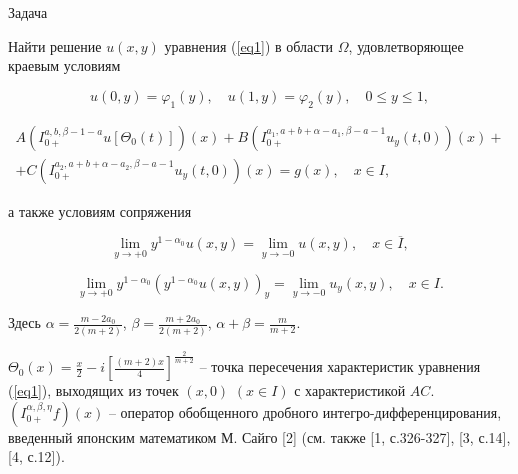 \begin{newthm}{Задача} {Найти решение $u(x,y)$ уравнения (\ref{eq1}) в области $\Omega$, удовлетворяющее краевым условиям

\begin{equation}

       \label{eq2}

u(0,y) = \varphi_{1}(y), \quad  u(1,y) = \varphi_{2}(y), \quad  0 \leqslant y \leqslant 1,

\end{equation}

\begin{equation}

      \label{eq3}{\begin{array}{l}

A \left( I^{ a,b,\beta-1-a}_{0+} u[ \Theta_{0}(t)] \right) (x)+B \left( I^{ a_{1},a+b+\alpha-a_{1}, \beta-a-1}_{0+} u_{y}(t,0) \right) (x)+ \\

 + C \left( I^{ a_{2},a+b+\alpha-a_{2},\beta-a-1}_{0+} u_{y}(t,0) \right) (x)=g(x), \quad x \in I,

\end{array}}

\end{equation}

\noindent а также условиям сопряжения

\begin{equation}

       \label{eq4}

\lim_{y \to +0} y^{1-\alpha_{0}} u(x,y) = \lim_{y \to -0} u(x,y), \quad   x \in \overline{I},

\end{equation}

\begin{equation}

       \label{eq5}

\lim_{y \to +0} y^{1-\alpha_{0}} \left( y^{1-\alpha_{0}}  u(x,y) \right)_{y} = \lim_{y \to -0} u_{y}(x,y), \quad   x \in  I.

\end{equation}

Здесь $\displaystyle \alpha=\frac{m-2a_{0}}{2(m+2)}$, $\displaystyle \beta =\frac{m+2a_{0}}{2(m+2)}$, $\displaystyle \alpha+\beta=\frac{m}{m+2}$.



\noindent $\displaystyle \Theta_{0}(x)=\frac{x}{2}-i \left[ \frac{(m+2)x}{4}\right]^{\frac{2}{m+2}}$ -- точка пересечения характеристик уравнения (\ref{eq1}), выходящих из точек $(x,0)$ $(x \in I)$ с характеристикой $AC$. $(I_{0+}^{\alpha, \beta, \eta} f)(x)$ -- оператор обобщенного дробного интегро-дифференцирования, введенный японским математиком М. Сайго [2] (см. также [1, с.326-327],  [3, с.14], [4, с.12]).

}
\end{newthm}
